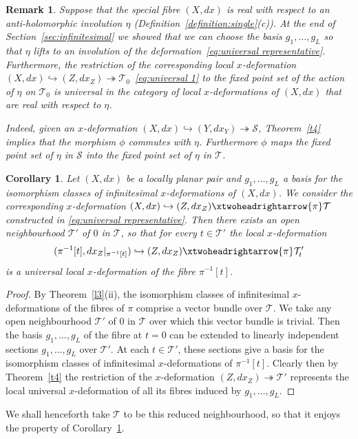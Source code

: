 \documentclass[11pt,twoside]{amsart}
\theoremstyle{plain}
\newtheorem{corollary}[theorem]{Corollary}
\newtheorem{remark}[theorem]{Remark}
\newcommand{\Sm}{\mathcal{S}}
\newcommand{\Tm}{\mathcal{T}}
\newcommand{\dfx}{dx}
\begin{document}
\begin{remark}
Suppose that the special fibre $(X,dx)$ is real with respect to an anti-holomorphic involution $\eta$ (Definition~\ref{definition:single}(c)). At the end of Section~\ref{sec:infinitesimal} we showed that we can choose the basis $g_1,\dotsc,g_L$ so that $\eta$ lifts to an involution of the deformation~\eqref{eq:universal representative}. Furthermore, the restriction of the corresponding local $x$-deformation $(X,\dfx)\hookrightarrow(Z,\dfx_Z)\twoheadrightarrow\Tm_0$~\eqref{eq:universal 1} to the fixed point set of the action of $\eta$ on $\Tm_0$ is universal in the category of local $x$-deformations of $(X,dx)$ that are real with respect to $\eta$. 

Indeed, given an $x$-deformation $(X,\dfx)\hookrightarrow(Y, d x_Y)\twoheadrightarrow\mathcal S$, Theorem~\ref{t4} implies that the morphism $\phi$ commutes with $\eta$. Furthermore $\phi$ maps the fixed point set of $\eta$ in $\Sm$ into the fixed point set of $\eta$ in $\Tm$. %
\end{remark}
\begin{corollary}\label {corollary:universal}
Let $ (X, d x) $ be a locally planar pair and $ g_1, \ldots , g_L $ a basis for the isomorphism classes of infinitesimal $ x $-deformations of $ (X, d x) $. We consider the corresponding $x$-deformation $(X,\dfx)\hookrightarrow(Z, \dfx_Z)\xtwoheadrightarrow{\pi}\Tm$ constructed in \eqref{eq:universal representative}.
Then there exists an open neighbourhood $\mathcal{T}'$ of $0$ in $\mathcal{T}$, so that for every $t \in \mathcal{T}'$ the local $x$-deformation 
$$ (\pi^{-1}[t], dx_Z|_{\pi^{-1}[t]}) \hookrightarrow (Z,dx_Z) \xtwoheadrightarrow{\pi} \mathcal{T}'_{t} $$
is a universal local $x$-deformation of the fibre $\pi^{-1}[t]$. 
\end{corollary}
\begin{proof}
By Theorem~\ref{l3}(ii), the isomorphism classes of infinitesimal $x$-deformations of the fibres of $\pi$ comprise a vector bundle over $\mathcal{T}$. We take any open neighbourhood $\mathcal{T}'$ of $0$ in $\mathcal{T}$ over which this vector bundle is trivial. Then the basis $g_1,\dotsc,g_L$ of the fibre at $t=0$ can be extended to linearly independent sections $g_1,\dotsc,g_L$ over $\mathcal{T}'$. At each $t\in \mathcal{T}'$, these sections give a basis for the isomorphism classes of infinitesimal $ x $-deformations of $\pi^{-1}[t]$.
Clearly then by Theorem~\ref{t4} the restriction of the $ x $-deformation $(Z, \dfx_Z)\twoheadrightarrow\Tm'$ represents the local universal $ x $-deformation of all its fibres induced by $g_1,\dotsc,g_L$. 
\end{proof}
We shall henceforth take $\Tm $ to be this reduced neighbourhood, so that it enjoys the property of Corollary~\ref {corollary:universal}. 
\end{document}
